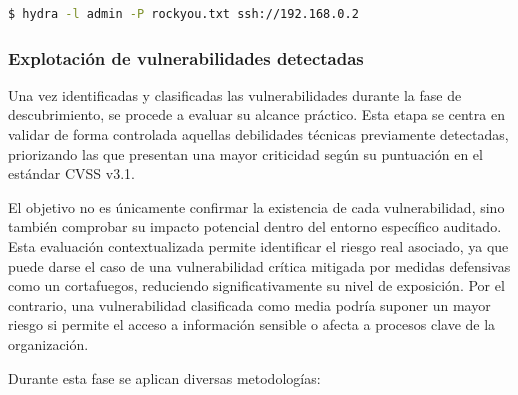 \documentclass[a4paper, 11pt]{article}
\begin{document}
\begin{lstlisting}[language=bash, style=terminalstyle, caption=Ejemplo de fuerza bruta contra SSH]
$ hydra -l admin -P rockyou.txt ssh://192.168.0.2
\end{lstlisting}




\subsubsection{Explotación de vulnerabilidades detectadas}


Una vez identificadas y clasificadas las vulnerabilidades durante la fase de descubrimiento, se procede a evaluar su alcance práctico. Esta etapa se centra en validar de forma controlada aquellas debilidades técnicas previamente detectadas, priorizando las que presentan una mayor criticidad según su puntuación en el estándar CVSS v3.1.

El objetivo no es únicamente confirmar la existencia de cada vulnerabilidad, sino también comprobar su impacto potencial dentro del entorno específico auditado. Esta evaluación contextualizada permite identificar el riesgo real asociado, ya que puede darse el caso de una vulnerabilidad crítica mitigada por medidas defensivas como un cortafuegos, reduciendo significativamente su nivel de exposición. Por el contrario, una vulnerabilidad clasificada como media podría suponer un mayor riesgo si permite el acceso a información sensible o afecta a procesos clave de la organización.

Durante esta fase se aplican diversas metodologías:
\end{document}
